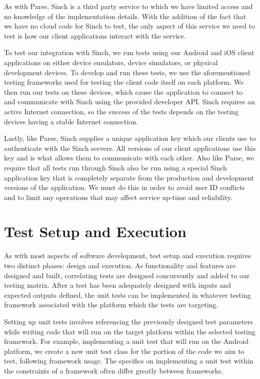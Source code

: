 As with Parse, Sinch is a third party service to which we have limited access
and no knowledge of the implementation details. With the addition of the fact
that we have no cloud code for Sinch to test, the only aspect of this service we
need to test is how our client applications interact with the service.

To test our integration with Sinch, we run tests using our Android and iOS
client applications on either device emulators, device simulators, or physical
development devices. To develop and run these tests, we use the aforementioned
testing frameworks used for testing the client code itself on each platform.
We then run our tests on these devices, which cause the application to connect
to and communicate with Sinch using the provided developer API. Sinch requires
an active Internet connection, so the success of the tests depends on the
testing devices having a stable Internet connection.

Lastly, like Parse, Sinch supplies a unique application key which our clients
use to authenticate with the Sinch servers. All versions of our client
applications use this key and is what allows them to communicate with each
other. Also like Parse, we require that all tests run through Sinch also be run
using a special Sinch application key that is completely separate from the
production and development versions of the application. We must do this in order
to avoid user ID conflicts and to limit any operations that may affect service
up-time and reliability.


\section{Test Setup and Execution}

As with most aspects of software development, test setup and execution requires
two distinct phases: design and execution. As functionality and features are
designed and built, correlating tests are designed concurrently and added to our
testing matrix. After a test has been adequately designed with inputs and
expected outputs defined, the unit tests can be implemented in whatever testing
framework associated with the platform which the tests are targeting.

Setting up unit tests involves referencing the previously designed test
parameters while writing code that will run on the target platform within the
selected testing framework. For example, implementing a unit test that will run
on the Android platform, we create a new unit test class for the portion of the
code we aim to test, following framework usage. The specifics on implementing a
unit test within the constraints of a framework often differ greatly between
frameworks.

